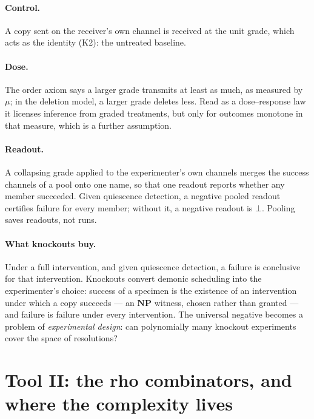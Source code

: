 \documentclass[11pt]{article}
\theoremstyle{definition}
\theoremstyle{plain}
\theoremstyle{remark}
\newcommand{\NPclass}{\mathbf{NP}}
\begin{document}
\paragraph{Control.} A copy sent on the receiver's own channel is
received at the unit grade, which acts as the identity (K2): the untreated
baseline.

\paragraph{Dose.} The order axiom says a larger grade transmits at least
as much, as measured by $\mu$; in the deletion model, a larger grade
deletes less. Read as a dose--response law it licenses inference from
graded treatments, but only for outcomes monotone in that measure, which
is a further assumption.

\paragraph{Readout.} A collapsing grade applied to the experimenter's own
channels merges the success channels of a pool onto one name, so that one
readout reports whether any member succeeded. Given quiescence detection,
a negative pooled readout certifies failure for every member; without it,
a negative readout is $\bot$. Pooling saves readouts, not runs.

\paragraph{What knockouts buy.} Under a full intervention, and given
quiescence detection, a failure is conclusive for that intervention.
Knockouts convert demonic scheduling into the experimenter's choice:
success of a specimen is the existence of an intervention under which a
copy succeeds --- an $\NPclass$ witness, chosen rather than granted ---
and failure is failure under every intervention. The universal negative
becomes a problem of \emph{experimental design}: can polynomially many
knockout experiments cover the space of resolutions?

\section{Tool II: the rho combinators, and where the complexity lives}\label{sec:comb}
\end{document}
